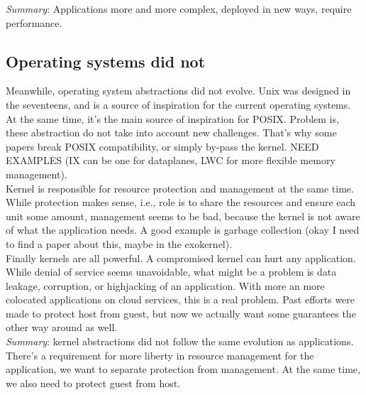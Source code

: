 
\textit{Summary}: Applications more and more complex, deployed in new ways, require performance.

\subsection{Operating systems did not}
Meanwhile, operating system abstractions did not evolve.
Unix was designed in the seventeens, and is a source of inspiration for the current operating systems.
At the same time, it's the main source of inspiration for POSIX.
Problem is, these abstraction do not take into account new challenges.
That's why some papers break POSIX compatibility, or simply by-pass the kernel.
NEED EXAMPLES (IX can be one for dataplanes, LWC for more flexible memory management).\\

Kernel is responsible for resource protection and management at the same time.
While protection makes sense, i.e., role is to share the resources and ensure each unit some amount,
management seems to be bad, because the kernel is not aware of what the application needs.
A good example is garbage collection (okay I need to find a paper about this, maybe in the exokernel).\\

Finally kernels are all powerful. A compromised kernel can hurt any application.
While denial of service seems unavoidable, what might be a problem is data leakage, corruption, or highjacking of an application.
With more an more colocated applications on cloud services, this is a real problem.
Past efforts were made to protect host from guest, but now we actually want some guarantees the other way around as well.\\

\textit{Summary}: kernel abstractions did not follow the same evolution as applications.
There's a requirement for more liberty in resource management for the application, we want to separate protection from management.
At the same time, we also need to protect guest from host.

